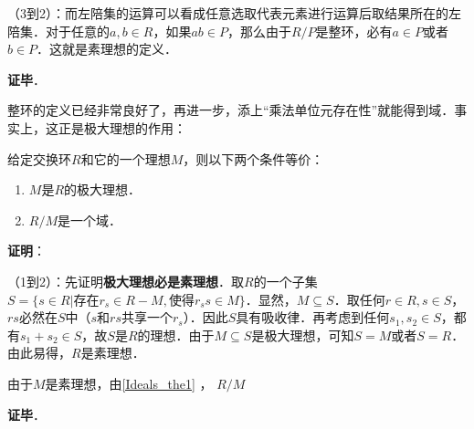 （3到2）：而左陪集的运算可以看成任意选取代表元素进行运算后取结果所在的左陪集．对于任意的$a, b\in R$，如果$ab\in P$，那么由于$R/P$是整环，必有$a\in P$或者$b\in P$．这就是素理想的定义．

\textbf{证毕}．

整环的定义已经非常良好了，再进一步，添上“乘法单位元存在性”就能得到域．事实上，这正是极大理想的作用：

\begin{theorem}{}
给定交换环$R$和它的一个理想$M$，则以下两个条件等价：
\begin{enumerate}
\item $M$是$R$的极大理想．
\item $R/M$是一个域．
\end{enumerate}
\end{theorem}

\textbf{证明}：

（1到2）：先证明\textbf{极大理想必是素理想}．取$R$的一个子集$S=\{s\in R|\text{存在} r_s\in R-M, \text{使得}r_ss\in M\}$．显然，$M\subseteq S$．取任何$r\in R, s\in S$，$rs$必然在$S$中（$s$和$rs$共享一个$r_s$）．因此$S$具有吸收律．再考虑到任何$s_1, s_2\in S$，都有$s_1+s_2\in S$，故$S$是$R$的理想．由于$M\subseteq S$是极大理想，可知$S=M$或者$S=R$．由此易得，$R$是素理想．

由于$M$是素理想，由\autoref{Ideals_the1} ， $R/M$

\textbf{证毕}．





